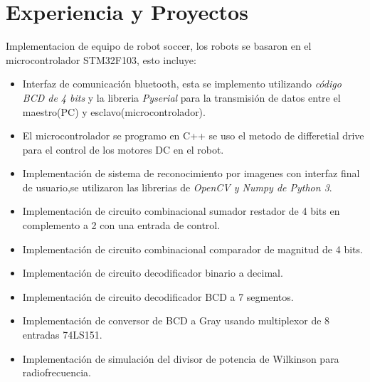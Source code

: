\documentclass[11pt,a4paper,sans]{moderncv}        %
\begin{document}
\section{Experiencia y Proyectos}
Implementacion de equipo de robot soccer, los robots se basaron en el microcontrolador STM32F103, esto incluye:
\begin{itemize}
\item{Interfaz de comunicación bluetooth, esta se implemento utilizando \textit{código BCD de 4 bits} y la libreria \textit{Pyserial} para la transmisión de datos entre el maestro(PC) y esclavo(microcontrolador).}
\item{El microcontrolador se programo en C++ se uso el metodo de differetial drive para el control de los motores DC en el robot.}
\item{Implementación de sistema de reconocimiento por imagenes con interfaz final de usuario,se utilizaron las librerias de \textit{OpenCV y Numpy de Python 3}.} 
\end{itemize}
\begin{itemize}
\item{Implementación de circuito combinacional sumador restador de 4 bits en complemento a 2 con una entrada de control.}
\item{Implementación de circuito combinacional comparador de magnitud de 4 bits.}
\item{Implementación de circuito decodificador binario a decimal.}
\item{Implementación de circuito decodificador BCD a 7 segmentos.}
\item{Implementación de conversor de BCD a Gray usando multiplexor de 8 entradas 74LS151.}
\end{itemize}
\begin{itemize}
\item{Implementación de simulación del divisor de potencia de Wilkinson para radiofrecuencia.}
\end{itemize}
\end{document}
